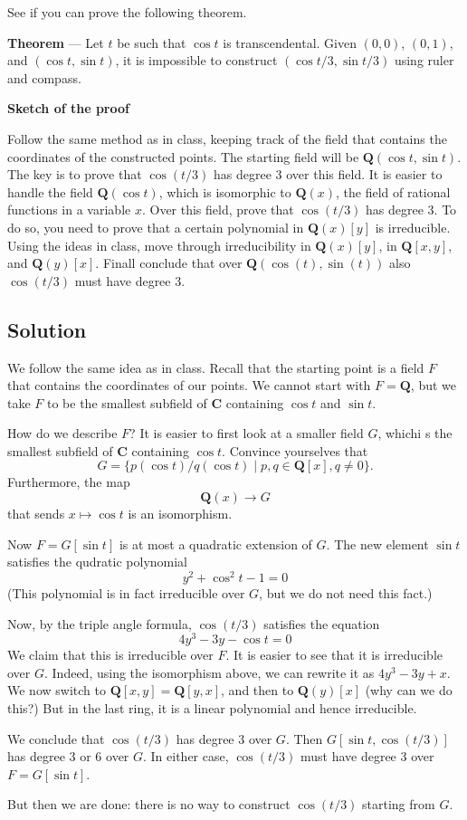 \documentclass[12pt]{amsart}
\begin{document}
See if you can prove the following theorem.

\bigskip

\noindent
\textbf{\textbf{Theorem}} ---
Let \(t\) be such that \(\cos t\) is transcendental.
Given \((0,0)\), \((0,1)\), and \((\cos t, \sin t)\), it is impossible to construct \((\cos t/3, \sin t/3)\) using ruler and compass.

\bigskip

\noindent
\textbf{\textbf{Sketch of the proof}}

Follow the same method as in class, keeping track of the field that contains the coordinates of the constructed points.
The starting field will be \(\mathbf{Q}(\cos t, \sin t)\).
The key is to prove that \(\cos (t/3)\) has degree 3 over this field.
It is easier to handle the field \(\mathbf{Q}(\cos t)\), which is isomorphic to \(\mathbf{Q}(x)\), the field of rational functions in a variable \(x\).
Over this field, prove that \(\cos(t/3)\) has degree 3.
To do so, you need to prove that a certain polynomial in \(\mathbf{Q}(x)[y]\) is irreducible.
Using the ideas in class, move through irreducibility in \(\mathbf{Q}(x)[y]\), in \(\mathbf{Q}[x,y]\), and \(\mathbf{Q}(y)[x]\).
Finall conclude that over \(\mathbf{Q}(\cos(t), \sin(t))\) also \(\cos(t/3)\) must have degree 3.
\subsection*{Solution}
\label{sec:orga417333}
We follow the same idea as in class.
Recall that the starting point is a field \(F\) that contains the coordinates of our points.
We cannot start with \(F = \mathbf{Q}\), but we take \(F\) to be the smallest subfield of \(\mathbf{C}\) containing \(\cos t\) and \(\sin t\).

How do we describe \(F\)?
It is easier to first look at a smaller field \(G\), whichi s the smallest subfield of \(\mathbf{C}\) containing \(\cos t\).
Convince yourselves that
\[ G = \{p(\cos t)/q(\cos t) \mid p, q \in \mathbf{Q}[x], q \neq 0\}.\]
Furthermore, the map
\[ \mathbf{Q}(x) \to G\]
that sends \(x \mapsto \cos t\) is an isomorphism.

Now \(F = G[\sin t]\) is at most a quadratic extension of \(G\).
The new element \(\sin t\) satisfies the qudratic polynomial
\[ y^2 + \cos^{2} t - 1 =  0\]
(This polynomial is in fact irreducible over \(G\), but we do not need this fact.)

Now, by the triple angle formula, \(\cos(t/3)\) satisfies the equation
\[ 4 y^3 - 3 y - \cos t = 0\]
We claim that this is irreducible over \(F\).
It is easier to see that it is irreducible over \(G\).
Indeed, using the isomorphism above, we can rewrite it as \(4y^3 - 3y + x\).
We now switch to \(\mathbf{Q}[x,y] = \mathbf{Q}[y,x]\), and then to \(\mathbf{Q}(y)[x]\) (why can we do this?)
But in the last ring, it is a linear polynomial and hence irreducible.

We conclude that \(\cos(t/3)\) has degree 3 over \(G\).
Then \(G[\sin t, \cos(t/3)]\) has degree 3 or 6 over \(G\).
In either case, \(\cos(t/3)\) must have degree 3 over \(F = G[\sin t]\).

But then we are done: there is no way to construct \(\cos (t/3)\) starting from \(G\).
\end{document}

